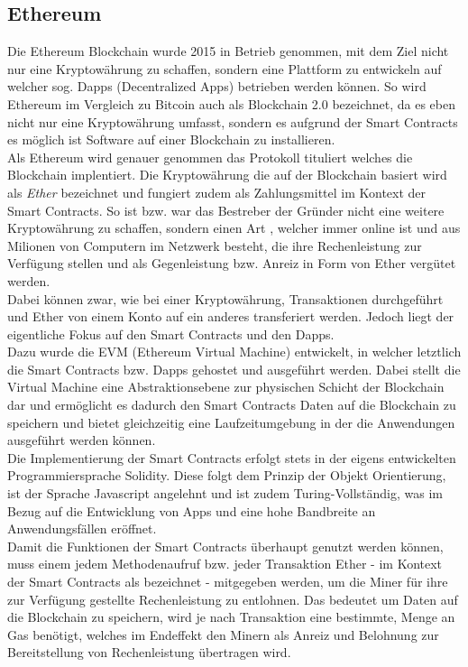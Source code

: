\subsection{Ethereum}
Die Ethereum Blockchain wurde 2015 in Betrieb genommen, mit dem Ziel nicht nur eine Kryptowährung zu schaffen, sondern eine Plattform zu entwickeln auf welcher sog. Dapps (Decentralized Apps) betrieben werden können.
So wird Ethereum im Vergleich zu Bitcoin auch als Blockchain 2.0 bezeichnet, da es eben nicht nur eine Kryptowährung umfasst, sondern es aufgrund der Smart Contracts es möglich ist Software auf einer Blockchain zu installieren. \\
Als Ethereum wird genauer genommen das Protokoll tituliert welches die Blockchain implentiert. Die Kryptowährung die auf der Blockchain basiert wird als \textit{Ether} bezeichnet und fungiert zudem als Zahlungsmittel im Kontext der Smart Contracts. So ist bzw. war das Bestreber der Gründer nicht eine weitere Kryptowährung zu schaffen, sondern einen Art , welcher immer online ist und aus Milionen von Computern im Netzwerk besteht, die ihre Rechenleistung zur Verfügung stellen und als Gegenleistung bzw. Anreiz in Form von Ether vergütet werden. \\
Dabei können zwar, wie bei einer Kryptowährung, Transaktionen durchgeführt und Ether von einem Konto auf ein anderes transferiert werden. Jedoch liegt der eigentliche Fokus auf den Smart Contracts und den Dapps.\\
Dazu wurde die EVM (Ethereum Virtual Machine) entwickelt, in welcher letztlich die Smart Contracts bzw. Dapps gehostet und ausgeführt werden. Dabei stellt die Virtual Machine eine Abstraktionsebene zur physischen Schicht der Blockchain dar und ermöglicht es dadurch den Smart Contracts Daten auf die Blockchain zu speichern und bietet gleichzeitig eine Laufzeitumgebung in der die Anwendungen ausgeführt werden können.\\
Die Implementierung der Smart Contracts erfolgt stets in der eigens entwickelten Programmiersprache Solidity. Diese folgt dem Prinzip der Objekt Orientierung, ist der Sprache Javascript angelehnt und ist zudem Turing-Vollständig, was im Bezug auf die Entwicklung von Apps und eine hohe Bandbreite an Anwendungsfällen eröffnet. \\
Damit die Funktionen der Smart Contracts überhaupt genutzt werden können, muss einem jedem Methodenaufruf bzw. jeder Transaktion Ether - im Kontext der Smart Contracts als  bezeichnet - mitgegeben werden, um die Miner für ihre zur Verfügung gestellte Rechenleistung zu entlohnen. Das bedeutet um Daten auf die Blockchain zu speichern, wird je nach Transaktion eine bestimmte, Menge an Gas benötigt, welches im Endeffekt den Minern als Anreiz und Belohnung zur Bereitstellung von Rechenleistung übertragen wird. \\
